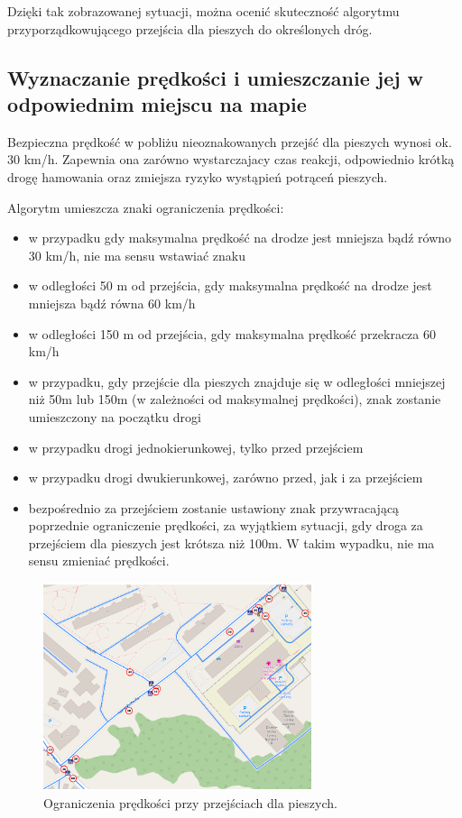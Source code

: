 Dzięki tak zobrazowanej sytuacji, można ocenić skuteczność algorytmu przyporządkowującego przejścia dla pieszych do określonych dróg.

\subsection{Wyznaczanie prędkości i umieszczanie jej w odpowiednim miejscu na mapie}

Bezpieczna prędkość w pobliżu nieoznakowanych przejść dla pieszych wynosi ok. 30 km/h. Zapewnia ona zarówno wystarczajacy czas reakcji, odpowiednio krótką drogę hamowania oraz zmiejsza ryzyko wystąpień potrąceń pieszych.

Algorytm umieszcza znaki ograniczenia prędkości:
\begin{itemize}
\item w przypadku gdy maksymalna prędkość na drodze jest mniejsza bądź równo 30 km/h, nie ma sensu wstawiać znaku
\item w odległości 50 m od przejścia, gdy maksymalna prędkość na drodze jest mniejsza bądź równa 60 km/h
\item w odległości 150 m od przejścia, gdy maksymalna prędkość przekracza 60 km/h
\item w przypadku, gdy przejście dla pieszych znajduje się w odległości mniejszej niż 50m lub 150m (w zależności od maksymalnej prędkości), znak zostanie umieszczony na początku drogi
\item w przypadku drogi jednokierunkowej, tylko przed przejściem
\item w przypadku drogi dwukierunkowej, zarówno przed, jak i za przejściem
\item bezpośrednio za przejściem zostanie ustawiony znak przywracającą poprzednie ograniczenie prędkości, za wyjątkiem sytuacji, gdy droga za przejściem dla pieszych jest krótsza niż 100m. W takim wypadku, nie ma sensu zmieniać prędkości.
\end{itemize}

\begin{figure}[h]
\caption{Ograniczenia prędkości przy przejściach dla pieszych.}
\label{sec:przejsciePredkosci}
\centering
\includegraphics[width=0.7\textwidth]{pedestrian_speed}
\end{figure}

